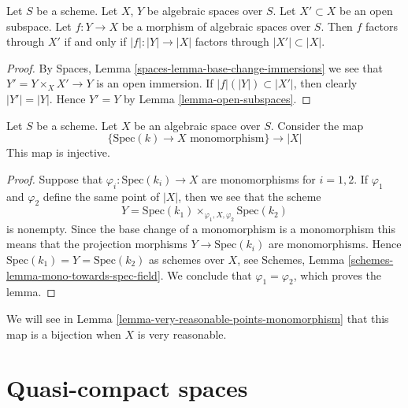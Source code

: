 \begin{lemma}
\label{lemma-factor-through-open-subspace}
Let $S$ be a scheme.
Let $X$, $Y$ be algebraic spaces over $S$.
Let $X' \subset X$ be an open subspace.
Let $f : Y \to X$ be a morphism of algebraic spaces over $S$.
Then $f$ factors through $X'$ if and only if $|f| : |Y| \to |X|$
factors through $|X'| \subset |X|$.
\end{lemma}

\begin{proof}
By Spaces, Lemma \ref{spaces-lemma-base-change-immersions}
we see that $Y' = Y \times_X X' \to Y$ is an open immersion.
If $|f|(|Y|) \subset |X'|$, then clearly $|Y'| = |Y|$. Hence $Y' = Y$ by
Lemma \ref{lemma-open-subspaces}.
\end{proof}

\begin{lemma}
\label{lemma-points-monomorphism}
Let $S$ be a scheme. Let $X$ be an algebraic space over $S$.
Consider the map
$$
\{\text{Spec}(k) \to X \text{ monomorphism}\}
\longrightarrow
|X|
$$
This map is injective.
\end{lemma}

\begin{proof}
Suppose that $\varphi_i : \text{Spec}(k_i) \to X$ are monomorphisms
for $i = 1, 2$. If $\varphi_1$ and $\varphi_2$ define the same point
of $|X|$, then we see that the scheme
$$
Y = \text{Spec}(k_1) \times_{\varphi_1, X, \varphi_2} \text{Spec}(k_2)
$$
is nonempty. Since the base change of a monomorphism is a monomorphism
this means that the projection morphisms $Y \to \text{Spec}(k_i)$
are monomorphisms. Hence $\text{Spec}(k_1) = Y = \text{Spec}(k_2)$
as schemes over $X$, see
Schemes, Lemma \ref{schemes-lemma-mono-towards-spec-field}.
We conclude that $\varphi_1 = \varphi_2$, which proves the lemma.
\end{proof}

\noindent
We will see in
Lemma \ref{lemma-very-reasonable-points-monomorphism}
that this map is a bijection when $X$ is very reasonable.

















\section{Quasi-compact spaces}
\label{section-quasi-compact}

